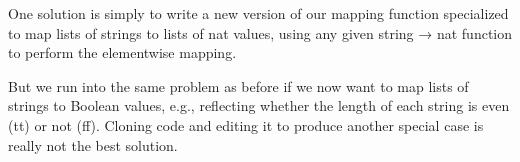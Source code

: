 \documentclass[letterpaper,10pt,english]{sphinxmanual}
\begin{document}
\begin{sphinxVerbatim}[commandchars=\\\{\}]
   \PYG{o}{[}  \PYG{o}{]}  
\end{sphinxVerbatim}

\sphinxAtStartPar
One solution is simply to write a new version of our mapping
function specialized to map lists of strings to lists of nat
values, using any given string → nat function to perform the
element\sphinxhyphen{}wise mapping.

\begin{sphinxVerbatim}[commandchars=\\\{\}]
           
    
       

   \PYG{o}{[}  \PYG{o}{]}
\end{sphinxVerbatim}

\sphinxAtStartPar
But we run into the same problem as before if we now want
to map lists of strings to Boolean values, e.g., reflecting
whether the length of each string is even (tt) or not (ff).
Cloning code and editing it to produce another special case
is really not the best solution.
\end{document}
